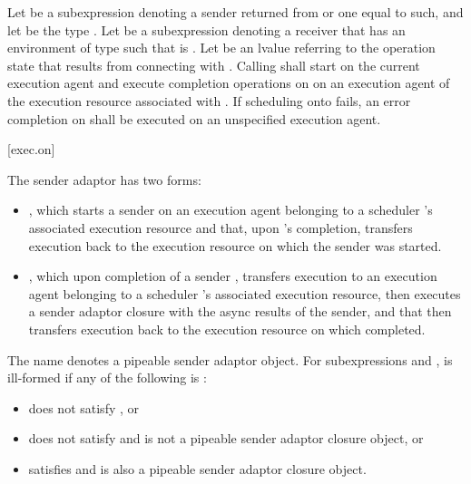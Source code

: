 \pnum
Let  be a subexpression denoting
a sender returned from  or one equal to such,
and let  be the type .
Let  be a subexpression denoting a receiver
that has an environment of type 
such that  is .
Let  be an lvalue referring to the operation state
that results from connecting  with .
Calling  shall
start  on the current execution agent and
execute completion operations on 
on an execution agent of the execution resource associated with .
If scheduling onto  fails,
an error completion on  shall be executed
on an unspecified execution agent.

[exec.on]{}

\pnum
The  sender adaptor has two forms:
\begin{itemize}
\item
{},
which starts a sender  on an execution agent
belonging to a scheduler 's associated execution resource and
that, upon 's completion,
transfers execution back to the execution resource
on which the  sender was started.
\item
{},
which upon completion of a sender ,
transfers execution to an execution agent
belonging to a scheduler 's associated execution resource,
then executes a sender adaptor closure 
with the async results of the sender, and
that then transfers execution back to the execution resource
on which  completed.
\end{itemize}

\pnum
The name  denotes a pipeable sender adaptor object.
For subexpressions  and ,
 is ill-formed if any of the following is :
\begin{itemize}
\item
{} does not satisfy , or
\item
{} does not satisfy  and
 is not
a pipeable sender adaptor closure object, or
\item
{} satisfies  and
is also a pipeable sender adaptor closure object.
\end{itemize}

